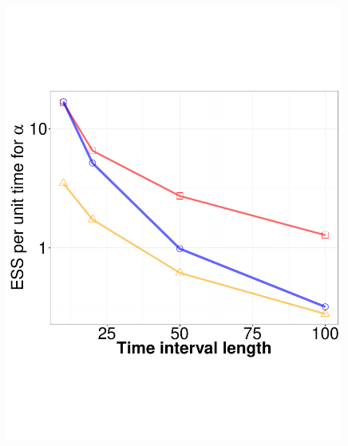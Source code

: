 {  \begin{figure}%
  \centering
  \begin{minipage}[hp]{0.24\linewidth}
  \centering
    \includegraphics [width=0.99\textwidth, angle=0]{figs/ESS_vs_t_alpha_fixobservation.pdf}
    \end{minipage}
  \begin{minipage}[hp]{0.24\linewidth}
  \centering

\end{minipage}
\end{figure}}
